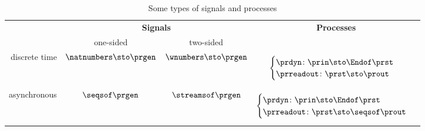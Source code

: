 \section{}
%

\begin{table*}[p]
\caption{Some types of signals and processes}
\begin{tabular}{rccc}
& \multicolumn{2}{c}{\textbf{Signals}} & \textbf{Processes} \\
&\rule{0pt}{10pt} one-sided & two-sided &   \\
discrete time &
$\natnumbers \sto \prgen$
&
$\wnumbers \sto \prgen$
&
\begin{minipage}{4cm}\raggedright
\begin{equation*}\label{eq:a}
    \begin{cases}
    \prdyn \colon \prin \sto \Endof \prst \\
    \prreadout \colon \prst \sto \prout
    \end{cases}
\end{equation*}
\end{minipage}
\\

asynchronous& $\seqsof \prgen$ &  $\streamsof \prgen$ &
\begin{minipage}{4cm}\raggedright
\begin{equation*}
\begin{cases}
\prdyn \colon \prin \sto \Endof \prst \\
\prreadout \colon \prst \sto \seqsof \prout
\end{cases}
\end{equation*}


\end{minipage}
\end{tabular}
\end{table*}
